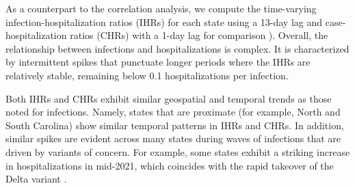 As a counterpart to the correlation analysis, we compute the
time-varying infection-hospitalization ratios (IHRs) for each state using a 
13-day lag and case-hospitalization ratios (CHRs) with a 1-day lag for comparison 
). Overall, the relationship between infections and hospitalizations is
complex. It is characterized by intermittent spikes that punctuate longer periods where
the IHRs are relatively stable, remaining below 0.1 hospitalizations per
infection. 

Both IHRs and CHRs exhibit similar geospatial and temporal trends as those noted
for infections. Namely, states that are proximate (for example, North and South
Carolina) show similar temporal patterns in IHRs and CHRs. In addition, similar
spikes are evident across many states during waves of infections that are driven
by variants of concern. For example, some states exhibit a striking increase in
hospitalizations in mid-2021, which coincides with the rapid takeover of the
Delta variant \citep{hodcroft2021covariants}. 





